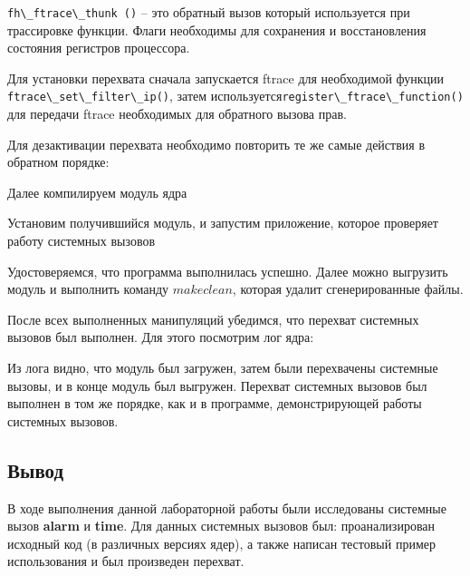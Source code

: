 

\lstinline|fh\_ftrace\_thunk ()| -- это обратный вызов который используется при трассировке функции. Флаги необходимы для сохранения и восстановления состояния регистров процессора. 

\par Для установки перехвата сначала запускается ftrace для необходимой функции \lstinline|ftrace\_set\_filter\_ip()|, затем используется\lstinline|register\_ftrace\_function()| для передачи ftrace необходимых для обратного вызова прав.

\par Для дезактивации перехвата необходимо повторить те же самые действия в обратном порядке:



\clearpage

\par Далее компилируем модуль ядра


\par Установим получившийся модуль, и запустим приложение, которое проверяет работу системных вызовов



\par Удостоверяемся, что программа выполнилась успешно. Далее можно выгрузить модуль и выполнить команду $make clean$, которая удалит сгенерированные файлы.



\par После всех выполненных манипуляций убедимся, что перехват системных вызовов был выполнен. Для этого посмотрим лог ядра:



\par Из лога видно, что модуль был загружен, затем были перехвачены системные вызовы, и в конце модуль был выгружен. Перехват системных вызовов был выполнен в том же порядке, как и в программе, демонстрирующей работы системных вызовов.

\subsection{Вывод} %
\par В ходе выполнения данной лабораторной работы были исследованы системные вызов \textbf{alarm} и \textbf{time}. Для данных системных вызовов был: проанализирован исходный код (в различных версиях ядер), а также написан тестовый пример использования и был произведен перехват.

\clearpage



